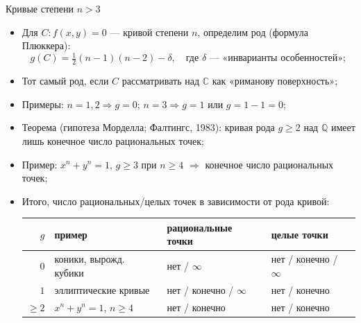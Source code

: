 \documentclass[serif, aspectratio=169]{beamer}
\newcommand{\sagemark}{%
  \textcolor{green!40!black}{\textbf{\texttt{sage:...}}}%
}
\begin{document}
\begin{frame}{Кривые степени $n>3$}
    \begin{itemize}
        \item Для $C: f(x,y)=0$ --- кривой степени $n$, определим род (формула Плюккера):
        \[g(C)=\tfrac{1}{2}(n-1)(n-2)-\delta,\quad \text{где }\delta\text{ --- «инварианты особенностей»};\]
        \item Тот самый род, если $C$ рассматривать над $\mathbb{C}$ как «риманову поверхность»;
        \item Примеры: $n=1,2\Rightarrow g=0$; $n=3\Rightarrow g=1$ или $g=1-1=0$;
        \item Теорема (гипотеза Морделла; Фалтингс, 1983): кривая рода $g\ge2$ над $\mathbb{Q}$ имеет лишь конечное число рациональных точек;
        \item Пример: $x^n+y^n=1$, $g\ge3$ при $n\ge4$ $\Rightarrow$ конечное число рациональных точек;
        \item Итого, число рациональных/целых точек в зависимости от рода кривой:
        \begin{center}
        \small
        \begin{tabular}{@{}rlll@{}}
            \toprule
            $g$ & пример & рациональные точки & целые точки \\
            \midrule
            $0$ & коники, вырожд. кубики & нет / $\infty$ & нет / конечно / $\infty$ \\
            $1$ & эллиптические кривые & нет / конечно / $\infty$ & нет / конечно \\
            $\ge2$ & $x^n+y^n=1$, $n\ge4$ & нет / конечно & нет / конечно \\
            \bottomrule
        \end{tabular}
        \end{center}
    \end{itemize}
\end{frame}
\end{document}
